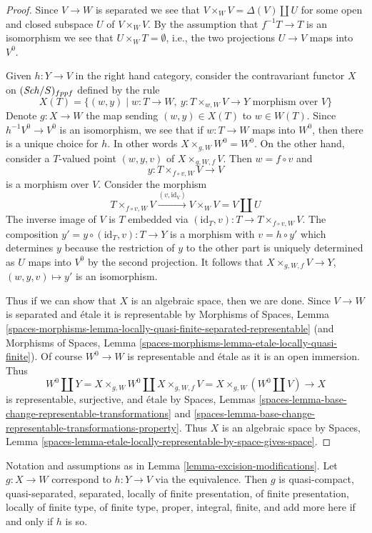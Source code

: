 \begin{proof}
Since $V \to W$ is separated we see that
$V \times_W V = \Delta(V) \amalg U$ for some open and closed subspace
$U$ of $V \times_W V$. By the assumption that $f^{-1}T \to T$ is an
isomorphism we see that $U \times_W T = \emptyset$, i.e., the two
projections $U \to V$ maps into $V^0$.

\medskip\noindent
Given $h : Y \to V$ in the right hand category, consider the
contravariant functor $X$ on $(\mathit{Sch}/S)_{fppf}$ defined by the rule
$$
X(T) = \{(w, y) \mid
w :  T \to W,\ y : T \times_{w, W} V \to Y\text{ morphism over }V\}
$$
Denote $g : X \to W$ the map sending $(w, y) \in X(T)$ to $w \in W(T)$.
Since $h^{-1}V^0 \to V^0$ is an isomorphism, we see that if
$w : T \to W$ maps into $W^0$, then there is a unique choice for $h$.
In other words $X \times_{g, W} W^0 = W^0$. On the other hand, consider
a $T$-valued point $(w, y, v)$ of $X \times_{g, W, f} V$.
Then $w = f \circ v$ and
$$
y : T \times_{f \circ v, W} V \longrightarrow V
$$
is a morphism over $V$. Consider the morphism
$$
T \times_{f \circ v, W} V \xrightarrow{(v, \text{id}_V)}
V \times_W V = V \amalg U
$$
The inverse image of $V$ is $T$ embedded via
$(\text{id}_T, v) : T \to T \times_{f \circ v, W} V$.
The composition $y' = y \circ (\text{id}_T, v) : T \to Y$
is a morphism with $v = h \circ y'$ which determines $y$ because the
restriction of $y$ to the other part is uniquely determined as
$U$ maps into $V^0$ by the second projection. It follows that
$X \times_{g, W, f} V \to Y$, $(w, y, v) \mapsto y'$ is an isomorphism.

\medskip\noindent
Thus if we can show that $X$ is an algebraic space, then we are done.
Since $V \to W$ is separated and \'etale it is representable by
Morphisms of Spaces, Lemma
\ref{spaces-morphisms-lemma-locally-quasi-finite-separated-representable}
(and Morphisms of Spaces, Lemma
\ref{spaces-morphisms-lemma-etale-locally-quasi-finite}).
Of course $W^0 \to W$ is representable and \'etale as it is an
open immersion. Thus
$$
W^0 \amalg Y = X \times_{g, W} W^0 \amalg X \times_{g, W, f} V
= X \times_{g, W} (W^0 \amalg V) \longrightarrow X
$$
is representable, surjective, and \'etale by Spaces, Lemmas
\ref{spaces-lemma-base-change-representable-transformations} and
\ref{spaces-lemma-base-change-representable-transformations-property}.
Thus $X$ is an algebraic
space by Spaces, Lemma
\ref{spaces-lemma-etale-locally-representable-by-space-gives-space}.
\end{proof}

\begin{lemma}
\label{lemma-excision-modifications-properties}
Notation and assumptions as in Lemma \ref{lemma-excision-modifications}.
Let $g : X \to W$ correspond to $h : Y \to V$ via the equivalence.
Then $g$ is quasi-compact, quasi-separated, separated, locally of finite
presentation, of finite presentation, locally of finite type, of finite type,
proper, integral, finite, and add more here if and only if
$h$ is so.
\end{lemma}

